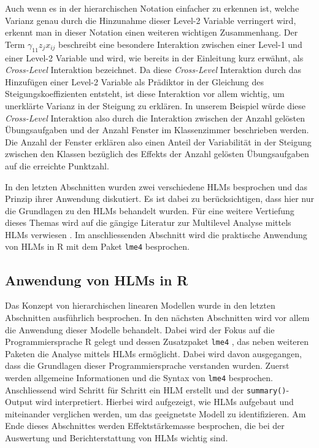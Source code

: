 \documentclass[12pt]{article}\usepackage[]{graphicx}\usepackage[]{color}
\begin{document}
Auch wenn es in der hierarchischen Notation einfacher zu erkennen ist, welche Varianz genau durch die Hinzunahme dieser Level-2 Variable verringert wird, erkennt man in dieser Notation einen weiteren wichtigen Zusammenhang. Der Term $\gamma_{11}z_{j}x_{ij}$ beschreibt eine besondere Interaktion zwischen einer Level-1 und einer Level-2 Variable und wird, wie bereits in der Einleitung kurz erwähnt, als \textit{Cross-Level} Interaktion bezeichnet. Da diese \textit{Cross-Level} Interaktion durch das Hinzufügen einer Level-2 Variable als Prädiktor in der Gleichung des Steigungskoeffizienten entsteht, ist diese Interaktion vor allem wichtig, um unerklärte Varianz in der Steigung zu erklären. In unserem Beispiel würde diese \textit{Cross-Level} Interaktion also durch die Interaktion zwischen der Anzahl gelösten Übungsaufgaben und der Anzahl Fenster im Klassenzimmer beschrieben werden. Die Anzahl der Fenster erklären also einen Anteil der Variabilität in der Steigung zwischen den Klassen bezüglich des Effekts der Anzahl gelösten Übungsaufgaben auf die erreichte Punktzahl.

In den letzten Abschnitten wurden zwei verschiedene HLMs besprochen und das Prinzip ihrer Anwendung diskutiert. Es ist dabei zu berücksichtigen, dass hier nur die Grundlagen zu den HLMs behandelt wurden. Für eine weitere Vertiefung dieses Themas wird auf die gängige Literatur zur Multilevel Analyse mittels HLMs verwiesen \citep{andrew_data, raudenbush2002hierarchical, SnijdersTomA.B2012Ma:a, twisk_2006}. Im anschliessenden Abschnitt wird die praktische Anwendung von HLMs in R mit dem Paket \texttt{lme4} \citep{batesetal2015lme4} besprochen.

\subsection{Anwendung von HLMs in R} \label{section:ml_in_R}
Das Konzept von hierarchischen linearen Modellen wurde in den letzten Abschnitten ausführlich besprochen. In den nächsten Abschnitten wird vor allem die Anwendung dieser Modelle behandelt. Dabei wird der Fokus auf die Programmiersprache R gelegt und dessen Zusatzpaket \texttt{lme4} \citep{batesetal2015lme4}, das neben weiteren Paketen die Analyse mittels HLMs ermöglicht. Dabei wird davon ausgegangen, dass die Grundlagen dieser Programmiersprache verstanden wurden. Zuerst werden allgemeine Informationen und die Syntax von \texttt{lme4} besprochen. Anschliessend wird Schritt für Schritt ein HLM erstellt und der \texttt{summary()}-Output wird interpretiert. Hierbei wird aufgezeigt, wie HLMs aufgebaut und miteinander verglichen werden, um das geeignetste Modell zu identifizieren. Am Ende dieses Abschnittes werden Effektstärkemasse besprochen, die bei der Auswertung und Berichterstattung von HLMs wichtig sind.  
\end{document}
